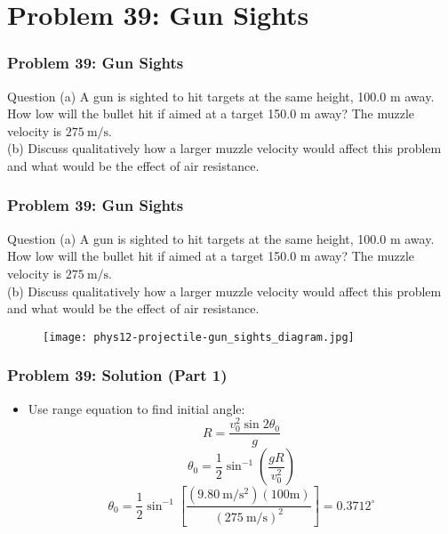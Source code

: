 \documentclass{beamer}
\begin{document}
\section{Problem 39: Gun Sights}

\begin{frame}
\frametitle{Problem 39: Gun Sights}
\begin{block}{Question}
(a) A gun is sighted to hit targets at the same height, 100.0 m away. How low will the bullet hit if aimed at a target 150.0 m away? The muzzle velocity is $275 \mathrm{~m} / \mathrm{s}$.\\

(b) Discuss qualitatively how a larger muzzle velocity would affect this problem and what would be the effect of air resistance.
\end{block}

\end{frame}

\begin{frame}
\frametitle{Problem 39: Gun Sights}
\begin{block}{Question}
(a) A gun is sighted to hit targets at the same height, 100.0 m away. How low will the bullet hit if aimed at a target 150.0 m away? The muzzle velocity is $275 \mathrm{~m} / \mathrm{s}$.\\

(b) Discuss qualitatively how a larger muzzle velocity would affect this problem and what would be the effect of air resistance.
\end{block}
\begin{figure}[H]
    \centering
    \texttt{[image: phys12-projectile-gun\_sights\_diagram.jpg]}
\end{figure}

\end{frame}

\begin{frame}
\frametitle{Problem 39: Solution (Part 1)}
\begin{itemize}
    \item Use range equation to find initial angle:
    $$R=\frac{v_{0}^{2} \sin 2 \theta_{0}}{g}$$
    $$\theta_{0}=\frac{1}{2} \sin ^{-1}\left(\frac{g R}{v_{0}^{2}}\right)$$
    $$\theta_{0}=\frac{1}{2} \sin ^{-1}\left[\frac{\left(9.80 \mathrm{~m} / \mathrm{s}^{2}\right)(100 \mathrm{m})}{(275 \mathrm{~m} / \mathrm{s})^{2}}\right]=0.3712^{\circ}$$
\end{itemize}
\end{frame}
\end{document}
